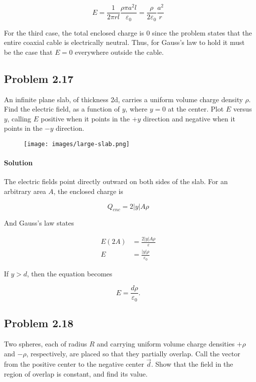 \documentclass{article}
\begin{document}
$$
E = \frac{1}{2\pi r l}\frac{\rho \pi a^2 l}{\varepsilon_0} = \frac{\rho}{2\varepsilon_0}\frac{a^2}{r}
$$


For the third case, the total enclosed charge is 0 since the problem states that the entire coaxial cable is electrically neutral. Thus, for Gauss's law to hold it must be the case that $E = 0$ everywhere outside the cable. 


\newpage

\subsection*{Problem 2.17}

An infinite plane slab, of thickness 2d, carries a uniform volume charge density $\rho$. Find the electric field, as a function of $y$, where $y = 0$ at the center. Plot $ E$ versus $y$, calling $E$ positive when it points in the $+y$ direction and negative when it points in the $-y$ direction.

\begin{figure}[h]
    \centering
    \texttt{[image: images/large-slab.png]}
\end{figure}

\paragraph{Solution} The electric fields point directly outward on both sides of the slab. For an arbitrary area $A$, the enclosed charge is 

$$
Q_{enc} = 2|y|A\rho
$$

And Gauss's law states

\begin{align*}
E (2A) &= \frac{2|y|A\rho}{\varepsilon} \\
E &= \frac{|y|\rho}{\varepsilon_0}
\end{align*}

If $y > d$, then the equation becomes

$$
E = \frac{d\rho}{\varepsilon_0}.
$$

\newpage

\subsection*{Problem 2.18}
 Two spheres, each of radius $R$ and carrying uniform volume charge densities $+\rho$ and $-\rho$, respectively, are placed so that they partially overlap. Call the vector from the positive center to the negative center $\vec{d}$.  Show
 that the field in the region of overlap is constant, and find its value.
\end{document}
